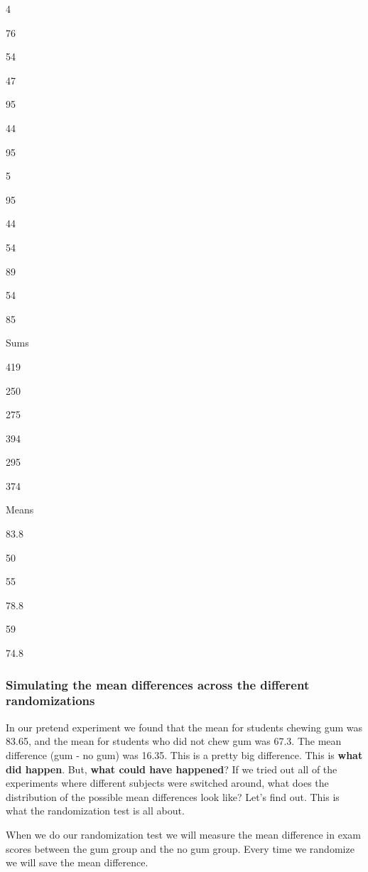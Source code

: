 \documentclass[]{book}
\begin{document}
4

76

54

47

95

44

95

5

95

44

54

89

54

85

Sums

419

250

275

394

295

374

Means

83.8

50

55

78.8

59

74.8

\hypertarget{simulating-the-mean-differences-across-the-different-randomizations}{%
\subsubsection{Simulating the mean differences across the different randomizations}\label{simulating-the-mean-differences-across-the-different-randomizations}}

In our pretend experiment we found that the mean for students chewing gum was 83.65, and the mean for students who did not chew gum was 67.3. The mean difference (gum - no gum) was 16.35. This is a pretty big difference. This is \textbf{what did happen}. But, \textbf{what could have happened}? If we tried out all of the experiments where different subjects were switched around, what does the distribution of the possible mean differences look like? Let's find out. This is what the randomization test is all about.

When we do our randomization test we will measure the mean difference in exam scores between the gum group and the no gum group. Every time we randomize we will save the mean difference.
\end{document}
